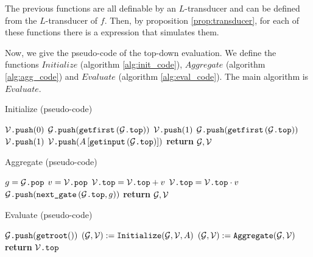 The previous functions are all definable by an $L$-transducer and can be defined from the $L$-transducer of $f$. Then, by proposition \ref{prop:transducer}, for each of these functions there is a \langfor expression that simulates them.

Now, we give the pseudo-code of the top-down evaluation. We define the functions $Initialize$ (algorithm \ref{alg:init_code}), $Aggregate$ (algorithm \ref{alg:agg_code}) and $Evaluate$ (algorithm \ref{alg:eval_code}). The main algorithm is $Evaluate$.

\begin{algorithm}
\caption{Initialize (pseudo-code)}\label{alg:init_code}
\begin{algorithmic}[1]
	\If{$\isplus{\gettop{\cG}}$}
		\State $\mathcal{V}\texttt{.push}(0)$
		\State $\mathcal{G}\texttt{.push}(\texttt{getfirst}\left(\mathcal{G}\texttt{.top} \right))$
	\ElsIf{$\isprod{\gettop{\cG}}$}
		\State $\mathcal{V}\texttt{.push}(1)$
		\State $\mathcal{G}\texttt{.push}(\texttt{getfirst}\left(\mathcal{G}\texttt{.top} \right))$
	\ElsIf{$\isone{\gettop{\cG}}$}
		\State $\mathcal{V}\texttt{.push}(1)$
	\ElsIf{$\isinput{\gettop{\cG}}$}
		\State $\mathcal{V}\texttt{.push}(A\left[ \texttt{getinput}\left(\mathcal{G}\texttt{.top} \right) \right])$
	\EndIf
	\State \textbf{return} $\mathcal{G}, \mathcal{V}$
\EndFunction
\end{algorithmic}
\end{algorithm}

\begin{algorithm}
\caption{Aggregate (pseudo-code)}\label{alg:agg_code}
\begin{algorithmic}[1]
	\State $g = \mathcal{G}\texttt{.pop}$
	\State $v = \mathcal{V}\texttt{.pop}$
	\If{$\isplus{\gettop{\cG}}$}
		\State $\mathcal{V}\texttt{.top} = \mathcal{V}\texttt{.top} + v$
	\ElsIf{$\isprod{\gettop{\cG}}$}
		\State $\mathcal{V}\texttt{.top} = \mathcal{V}\texttt{.top} \cdot v$
	\EndIf
		\State $\mathcal{G}\texttt{.push}(\texttt{next{\_}gate}\left(\mathcal{G}\texttt{.top}, g \right))$
	\EndIf
	\State \textbf{return} $\mathcal{G}, \mathcal{V}$
\EndFunction
\end{algorithmic}
\end{algorithm}

\begin{algorithm}
\caption{Evaluate (pseudo-code)}\label{alg:eval_code}
\begin{algorithmic}[1]
	\State $\mathcal{G}\texttt{.push}(\texttt{getroot}())$
			\State $(\mathcal{G},\mathcal{V}) := \texttt{Initialize}(\mathcal{G},\mathcal{V},A)$
		\Else
			\State $(\mathcal{G},\mathcal{V}):= \texttt{Aggregate}(\mathcal{G},\mathcal{V})$
		\EndIf
	\EndWhile
	\State \textbf{return} $\mathcal{V}\texttt{.top}$
\EndFunction
\end{algorithmic}
\end{algorithm}

